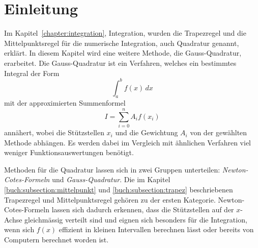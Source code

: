%
%
%
\section{Einleitung\label{quadratur:section:einleitung}}

Im Kapitel~\ref{chapter:integration}, Integration, wurden die 
Trapezregel und die Mittelpunktsregel für die numerische Integration, 
%
%
auch Quadratur genannt, erklärt. 
%
In diesem Kapitel wird eine weitere Methode, die Gauss-Quadratur, erarbeitet.
Die Gauss-Quadratur ist ein Verfahren, welches ein bestimmtes Integral der Form
%
\begin{equation}
    \int_{a}^{b} f(x) \,dx
\end{equation}
mit der approximierten Summenformel
%
\begin{equation} \label{quadratur:equation:quadraturapproxsumme}
    I = \sum_{i=0}^{n} A_i f(x_i)
\end{equation}
annähert, wobei die Stützstellen $x_i$ und die Gewichtung $A_i$ von der gewählten 
Methode abhängen. 
Es werden dabei im Vergleich mit ähnlichen Verfahren viel weniger Funktionsauswertungen benötigt.

Methoden für die Quadratur lassen sich in zwei Gruppen unterteilen: 
{\em Newton-Cotes-Formeln} und {\em Gauss-Quadratur}.
%
Die im Kapitel \ref{buch:subsection:mittelpunkt} und \ref{buch:subsection:trapez} beschriebenen
Trapezregel und Mittelpunktsregel gehören zu der ersten Kategorie.
%
%
Newton-Cotes-Formeln lassen sich dadurch erkennen, dass die Stützstellen auf der $x$-Achse 
gleichmässig verteilt sind und eignen sich besonders für die Integration, wenn sich $f(x)$ 
effizient in kleinen Intervallen berechnen lässt oder bereits von Computern berechnet worden ist.







